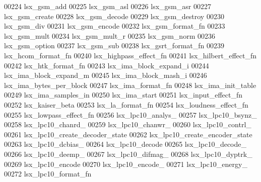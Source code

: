 \begin{DoxyCode}
00224 \textcolor{stringliteral}{lsx\_gsm\_add}
00225 \textcolor{stringliteral}{lsx\_gsm\_asl}
00226 \textcolor{stringliteral}{lsx\_gsm\_asr}
00227 \textcolor{stringliteral}{lsx\_gsm\_create}
00228 \textcolor{stringliteral}{lsx\_gsm\_decode}
00229 \textcolor{stringliteral}{lsx\_gsm\_destroy}
00230 \textcolor{stringliteral}{lsx\_gsm\_div}
00231 \textcolor{stringliteral}{lsx\_gsm\_encode}
00232 \textcolor{stringliteral}{lsx\_gsm\_format\_fn}
00233 \textcolor{stringliteral}{lsx\_gsm\_mult}
00234 \textcolor{stringliteral}{lsx\_gsm\_mult\_r}
00235 \textcolor{stringliteral}{lsx\_gsm\_norm}
00236 \textcolor{stringliteral}{lsx\_gsm\_option}
00237 \textcolor{stringliteral}{lsx\_gsm\_sub}
00238 \textcolor{stringliteral}{lsx\_gsrt\_format\_fn}
00239 \textcolor{stringliteral}{lsx\_hcom\_format\_fn}
00240 \textcolor{stringliteral}{lsx\_highpass\_effect\_fn}
00241 \textcolor{stringliteral}{lsx\_hilbert\_effect\_fn}
00242 \textcolor{stringliteral}{lsx\_htk\_format\_fn}
00243 \textcolor{stringliteral}{lsx\_ima\_block\_expand\_i}
00244 \textcolor{stringliteral}{lsx\_ima\_block\_expand\_m}
00245 \textcolor{stringliteral}{lsx\_ima\_block\_mash\_i}
00246 \textcolor{stringliteral}{lsx\_ima\_bytes\_per\_block}
00247 \textcolor{stringliteral}{lsx\_ima\_format\_fn}
00248 \textcolor{stringliteral}{lsx\_ima\_init\_table}
00249 \textcolor{stringliteral}{lsx\_ima\_samples\_in}
00250 \textcolor{stringliteral}{lsx\_ima\_start}
00251 \textcolor{stringliteral}{lsx\_input\_effect\_fn}
00252 \textcolor{stringliteral}{lsx\_kaiser\_beta}
00253 \textcolor{stringliteral}{lsx\_la\_format\_fn}
00254 \textcolor{stringliteral}{lsx\_loudness\_effect\_fn}
00255 \textcolor{stringliteral}{lsx\_lowpass\_effect\_fn}
00256 \textcolor{stringliteral}{lsx\_lpc10\_analys\_}
00257 \textcolor{stringliteral}{lsx\_lpc10\_bsynz\_}
00258 \textcolor{stringliteral}{lsx\_lpc10\_chanrd\_}
00259 \textcolor{stringliteral}{lsx\_lpc10\_chanwr\_}
00260 \textcolor{stringliteral}{lsx\_lpc10\_contrl\_}
00261 \textcolor{stringliteral}{lsx\_lpc10\_create\_decoder\_state}
00262 \textcolor{stringliteral}{lsx\_lpc10\_create\_encoder\_state}
00263 \textcolor{stringliteral}{lsx\_lpc10\_dcbias\_}
00264 \textcolor{stringliteral}{lsx\_lpc10\_decode}
00265 \textcolor{stringliteral}{lsx\_lpc10\_decode\_}
00266 \textcolor{stringliteral}{lsx\_lpc10\_deemp\_}
00267 \textcolor{stringliteral}{lsx\_lpc10\_difmag\_}
00268 \textcolor{stringliteral}{lsx\_lpc10\_dyptrk\_}
00269 \textcolor{stringliteral}{lsx\_lpc10\_encode}
00270 \textcolor{stringliteral}{lsx\_lpc10\_encode\_}
00271 \textcolor{stringliteral}{lsx\_lpc10\_energy\_}
00272 \textcolor{stringliteral}{lsx\_lpc10\_format\_fn}

\end{DoxyCode}
